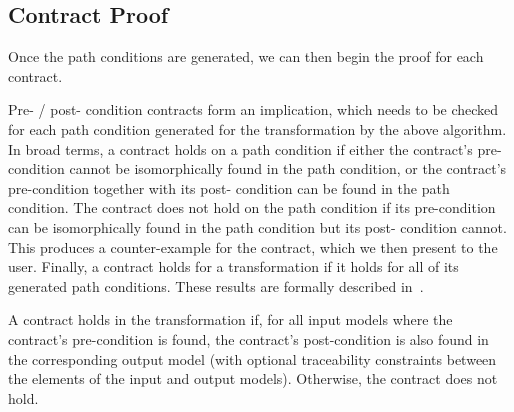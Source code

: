\subsection{Contract Proof}

Once the path conditions are generated, we can then begin the proof for each contract.

Pre- / post- condition contracts form an implication, which
needs to be checked for each path condition generated for
the transformation by the above algorithm. In broad terms,
a contract holds on a path condition if either the contract’s
pre-condition cannot be isomorphically found in the path
condition, or the contract’s pre-condition together with its post-
condition can be found in the path condition. The contract
does not hold on the path condition if its pre-condition can
be isomorphically found in the path condition but its post-
condition cannot. This produces a counter-example for the contract, which we then present to the user. Finally, a contract holds for a transformation if it holds for all of its generated path conditions. These results
are formally described in~\cite{Lucio2014}.

A contract holds in the transformation if, for all input models where the contract's pre-condition is found, the contract's post-condition is also found in the corresponding output model (with optional traceability constraints between the elements of the input and output models). Otherwise, the contract does not hold.






